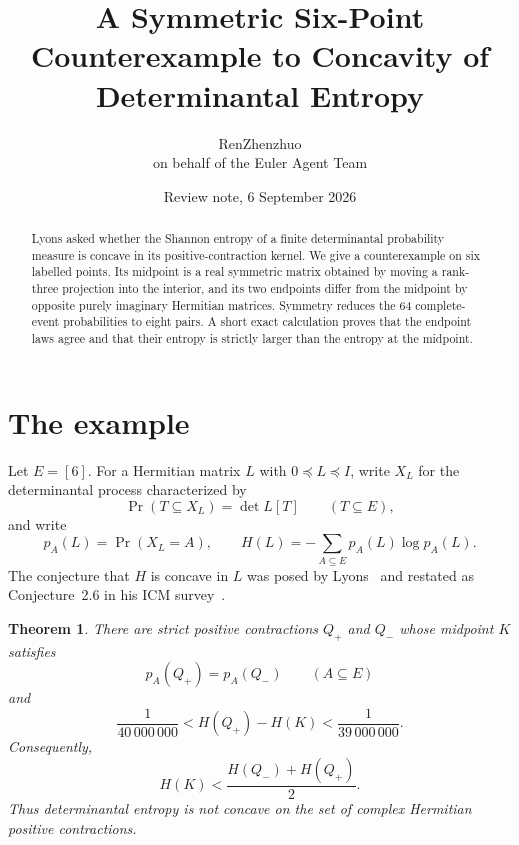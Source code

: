 \documentclass[11pt]{article}
\title{A Symmetric Six-Point Counterexample to Concavity of Determinantal Entropy}
\author{RenZhenzhuo\\\small on behalf of the Euler Agent Team}
\date{Review note, 6 September 2026}
\newtheorem{theorem}{Theorem}
\begin{document}
\maketitle

\begin{abstract}
Lyons asked whether the Shannon entropy of a finite determinantal probability
measure is concave in its positive-contraction kernel.  We give a counterexample
on six labelled points.  Its midpoint is a real symmetric matrix obtained by
moving a rank-three projection into the interior, and its two endpoints differ
from the midpoint by opposite purely imaginary Hermitian matrices.  Symmetry
reduces the 64 complete-event probabilities to eight pairs.  A short exact
calculation proves that the endpoint laws agree and that their entropy is
strictly larger than the entropy at the midpoint.
\end{abstract}

\section{The example}

Let $E=[6]$.  For a Hermitian matrix $L$ with $0\preceq L\preceq I$,
write $X_L$ for the determinantal process characterized by
\[
 \Pr(T\subseteq X_L)=\det L[T]\qquad(T\subseteq E),
\]
and write
\[
 p_A(L)=\Pr(X_L=A),\qquad
 H(L)=-\sum_{A\subseteq E}p_A(L)\log p_A(L).
\]
The conjecture that $H$ is concave in $L$ was posed by
Lyons~\cite{Lyons2003DPM} and restated as Conjecture~2.6 in his ICM
survey~\cite{Lyons2014}.

\begin{theorem}\label{thm:main}
There are strict positive contractions $Q_+$ and $Q_-$ whose midpoint $K$
satisfies
\[
 p_A(Q_+)=p_A(Q_-)\qquad(A\subseteq E)
\]
and
\begin{equation}\label{eq:gap}
 \frac1{40\,000\,000}
 <H(Q_+)-H(K)
 <\frac1{39\,000\,000}.
\end{equation}
Consequently,
\[
 H(K)<\frac{H(Q_-)+H(Q_+)}2.
\]
Thus determinantal entropy is not concave on the set of complex Hermitian
positive contractions.
\end{theorem}
\end{document}
